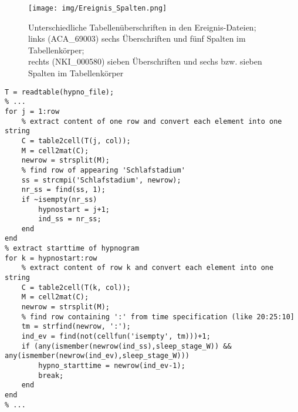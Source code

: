 \begin{figure}[H]
	\centering
	\texttt{[image: img/Ereignis\_Spalten.png]}
	\caption[Tabellenüberschriften in den Ereignis-Dateien]{Unterschiedliche Tabellenüberschriften in den Ereignis-Dateien;\\links (ACA\_69003) sechs Überschriften und fünf Spalten im Tabellenkörper;\\rechts (NKI\_000580) sieben Überschriften und sechs bzw. sieben Spalten im Tabellenkörper}
	\label{fig:spalten}
\end{figure}

\begin{lstlisting}[caption={Implementierung Kriterium D1 in Skript restructure\_hypnogram.m}, label={lst:D1}]
T = readtable(hypno_file);
% ...
for j = 1:row
    % extract content of one row and convert each element into one string
    C = table2cell(T(j, col));
    M = cell2mat(C);
    newrow = strsplit(M);
    % find row of appearing 'Schlafstadium'
    ss = strcmpi('Schlafstadium', newrow);
    nr_ss = find(ss, 1);
    if ~isempty(nr_ss)
        hypnostart = j+1;
        ind_ss = nr_ss;
    end
end
% extract starttime of hypnogram
for k = hypnostart:row
    % extract content of row k and convert each element into one string
    C = table2cell(T(k, col));
    M = cell2mat(C);
    newrow = strsplit(M);
    % find row containing ':' from time specification (like 20:25:10]
    tm = strfind(newrow, ':');
    ind_ev = find(not(cellfun('isempty', tm)))+1;
    if (any(ismember(newrow(ind_ss),sleep_stage_W)) && any(ismember(newrow(ind_ev),sleep_stage_W)))
        hypno_starttime = newrow(ind_ev-1);
        break;
    end
end
% ...
\end{lstlisting}

